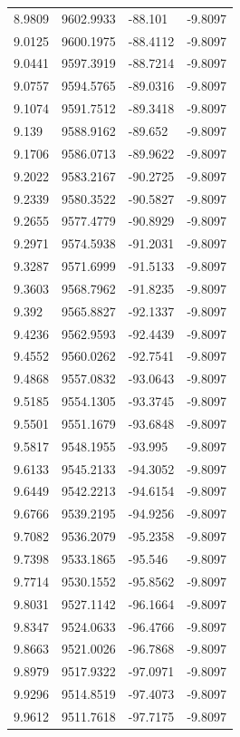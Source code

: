 \begin{table}[H]
\begin{tabular}{llll}
8.9809 & 9602.9933 & -88.101 & -9.8097 \\
9.0125 & 9600.1975 & -88.4112 & -9.8097 \\
9.0441 & 9597.3919 & -88.7214 & -9.8097 \\
9.0757 & 9594.5765 & -89.0316 & -9.8097 \\
9.1074 & 9591.7512 & -89.3418 & -9.8097 \\
9.139 & 9588.9162 & -89.652 & -9.8097 \\
9.1706 & 9586.0713 & -89.9622 & -9.8097 \\
9.2022 & 9583.2167 & -90.2725 & -9.8097 \\
9.2339 & 9580.3522 & -90.5827 & -9.8097 \\
9.2655 & 9577.4779 & -90.8929 & -9.8097 \\
9.2971 & 9574.5938 & -91.2031 & -9.8097 \\
9.3287 & 9571.6999 & -91.5133 & -9.8097 \\
9.3603 & 9568.7962 & -91.8235 & -9.8097 \\
9.392 & 9565.8827 & -92.1337 & -9.8097 \\
9.4236 & 9562.9593 & -92.4439 & -9.8097 \\
9.4552 & 9560.0262 & -92.7541 & -9.8097 \\
9.4868 & 9557.0832 & -93.0643 & -9.8097 \\
9.5185 & 9554.1305 & -93.3745 & -9.8097 \\
9.5501 & 9551.1679 & -93.6848 & -9.8097 \\
9.5817 & 9548.1955 & -93.995 & -9.8097 \\
9.6133 & 9545.2133 & -94.3052 & -9.8097 \\
9.6449 & 9542.2213 & -94.6154 & -9.8097 \\
9.6766 & 9539.2195 & -94.9256 & -9.8097 \\
9.7082 & 9536.2079 & -95.2358 & -9.8097 \\
9.7398 & 9533.1865 & -95.546 & -9.8097 \\
9.7714 & 9530.1552 & -95.8562 & -9.8097 \\
9.8031 & 9527.1142 & -96.1664 & -9.8097 \\
9.8347 & 9524.0633 & -96.4766 & -9.8097 \\
9.8663 & 9521.0026 & -96.7868 & -9.8097 \\
9.8979 & 9517.9322 & -97.0971 & -9.8097 \\
9.9296 & 9514.8519 & -97.4073 & -9.8097 \\
9.9612 & 9511.7618 & -97.7175 & -9.8097 \\

\end{tabular}
\end{table}
